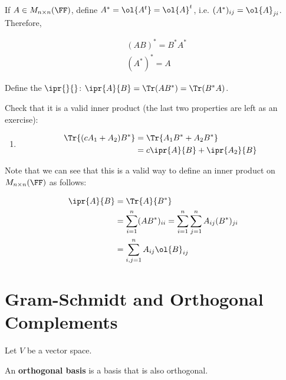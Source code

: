 \documentclass[11pt]{scrartcl}
\begin{document}
\begin{example}

  If $A\in M_{n\times n}(\FF)$, define
  $A^{*} = \ol{A^{t}} = \ol{A}^{t}$, i.e.
  $(A^{*})_{ij} = \ol{A}_{ji}$. Therefore,

  \begin{align}
    & (AB)^{*} = B^{*}A^{*} \\
    & (A^{*})^{*} = A
  \end{align}

  Define the $\ipr{\*}{\*}$: $\ipr{A}{B} = \Tr(AB^{*}) = \Tr(B^{*}A)$.

  Check that it is a valid inner product (the last two properties are
  left as an exercise):

  \begin{enumerate}[label=\alph*)]
  \item \begin{align}
          \Tr{(cA_1+A_2)B^{*}} & = \Tr{A_1B^{*}+A_2B^{*}} \\
                               & = c \ipr{A}{B} + \ipr{A_2}{B}
        \end{align}
  \end{enumerate}

  Note that we can see that this is a valid way to define an inner
  product on $M_{n\times n}(\FF)$ as follows:

  \begin{align}
    \ipr{A}{B} & = \Tr{A}{B^{*}}                                                              \\
               & = \sum_{i=1}^{n}(AB^{*})_{ii} = \sum_{i=1}^n\sum_{j=1}^{n}A_{ij}(B^{*})_{ji} \\
               & = \sum_{i, j =1}^{n}A_{ij}\ol{B}_{ij}
  \end{align}
\end{example}
\section{Gram-Schmidt and Orthogonal Complements}

Let $V$ be a vector space.

\begin{definition}
An \textbf{orthogonal basis} is a basis that is also orthogonal.
\end{definition}
\end{document}

